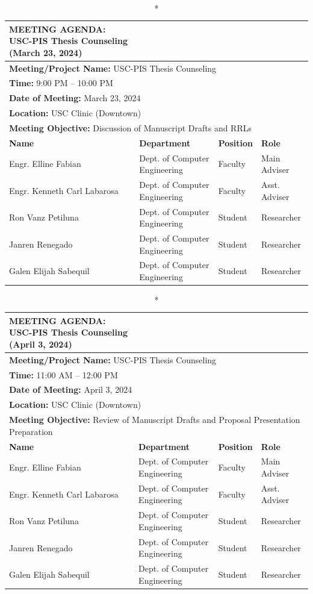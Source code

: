\begin{longtable}{|p{4cm}|p{4cm}|p{3cm}|p{3cm}|}
\caption*{MEETING AGENDA: USC-PIS Thesis Counseling (March 23, 2024)} \\
\hline
\multicolumn{4}{|l|}{\textbf{Meeting/Project Name:} USC-PIS Thesis Counseling} \\
\multicolumn{4}{|l|}{\textbf{Time:} 9:00 PM – 10:00 PM} \\
\multicolumn{4}{|l|}{\textbf{Date of Meeting:} March 23, 2024} \\
\multicolumn{4}{|l|}{\textbf{Location:} USC Clinic (Downtown)} \\
\multicolumn{4}{|l|}{\textbf{Meeting Objective:} Discussion of Manuscript Drafts and RRLs} \\
\hline
\textbf{Name} & \textbf{Department} & \textbf{Position} & \textbf{Role} \\
\hline
Engr. Elline Fabian & Dept. of Computer Engineering & Faculty & Main Adviser \\
\hline
Engr. Kenneth Carl Labarosa & Dept. of Computer Engineering & Faculty & Asst. Adviser \\
\hline
Ron Vanz Petiluna & Dept. of Computer Engineering & Student & Researcher \\
\hline
Janren Renegado & Dept. of Computer Engineering & Student & Researcher \\
\hline
Galen Elijah Sabequil & Dept. of Computer Engineering & Student & Researcher \\
\hline
\end{longtable}

\begin{longtable}{|p{4cm}|p{4cm}|p{3cm}|p{3cm}|}
\caption*{MEETING AGENDA: USC-PIS Thesis Counseling (April 3, 2024)} \\
\hline
\multicolumn{4}{|l|}{\textbf{Meeting/Project Name:} USC-PIS Thesis Counseling} \\
\multicolumn{4}{|l|}{\textbf{Time:} 11:00 AM – 12:00 PM} \\
\multicolumn{4}{|l|}{\textbf{Date of Meeting:} April 3, 2024} \\
\multicolumn{4}{|l|}{\textbf{Location:} USC Clinic (Downtown)} \\
\multicolumn{4}{|l|}{\textbf{Meeting Objective:} Review of Manuscript Drafts and Proposal Presentation Preparation} \\
\hline
\textbf{Name} & \textbf{Department} & \textbf{Position} & \textbf{Role} \\
\hline
Engr. Elline Fabian & Dept. of Computer Engineering & Faculty & Main Adviser \\
\hline
Engr. Kenneth Carl Labarosa & Dept. of Computer Engineering & Faculty & Asst. Adviser \\
\hline
Ron Vanz Petiluna & Dept. of Computer Engineering & Student & Researcher \\
\hline
Janren Renegado & Dept. of Computer Engineering & Student & Researcher \\
\hline
Galen Elijah Sabequil & Dept. of Computer Engineering & Student & Researcher \\
\hline
\end{longtable}

